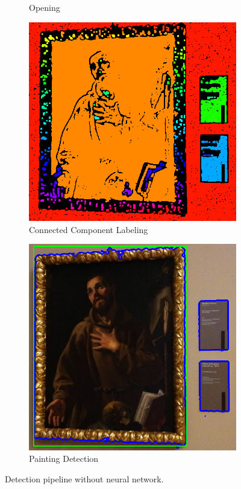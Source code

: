 \begin{figure}[ht!]
\begin{subfigure}[b]{0.3\textwidth}
        \caption*{Opening}\label{fig:opening}
      \end{subfigure}\hfill
      \begin{subfigure}[b]{0.3\textwidth}
      \captionsetup{font=small}
        \includegraphics[width=\linewidth]{pictures/painting_detection/5-ccl.PNG}
        \caption*{Connected Component Labeling}\label{fig:ccl}
      \end{subfigure}\hfill
      \begin{subfigure}[b]{0.3\textwidth}%
        \includegraphics[width=\linewidth]{pictures/painting_detection/6-bbox.PNG}
        \caption*{Painting Detection}\label{fig:bbox}
      \end{subfigure}
      \caption{Detection pipeline without neural network.} \label{fig:pipeline_detection}
  \end{figure}

